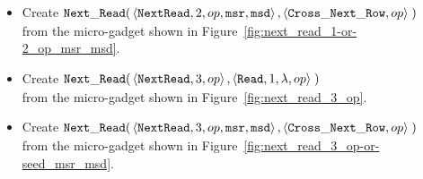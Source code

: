 \begin{itemize}
    \item Create
    $\begin{aligned}[t]
        {\tt Next\_Read}(& \left\langle {\tt NextRead}, 2,      op, {\tt msr}, {\tt msd} \right\rangle,
                    \left\langle {\tt Cross\_Next\_Row}, op                       \right\rangle \;)
    \end{aligned}$\\from the micro-gadget shown in Figure~\ref{fig:next_read_1-or-2_op_msr_msd}.


    \item Create
    $\begin{aligned}[t]
        {\tt Next\_Read}(& \left\langle {\tt NextRead}, 3,          op \right\rangle,
                    \left\langle {\tt Read},     1, \lambda, op \right\rangle \;)
    \end{aligned}$\\from the micro-gadget shown in Figure~\ref{fig:next_read_3_op}.

    \item Create
    $\begin{aligned}[t]
        {\tt Next\_Read}(& \left\langle {\tt NextRead}, 3,      op, {\tt msr}, {\tt msd} \right\rangle,
                    \left\langle {\tt Cross\_Next\_Row}, op \right\rangle \;)
    \end{aligned}$\\from the micro-gadget shown in Figure~\ref{fig:next_read_3_op-or-seed_msr_msd}.
\end{itemize}

